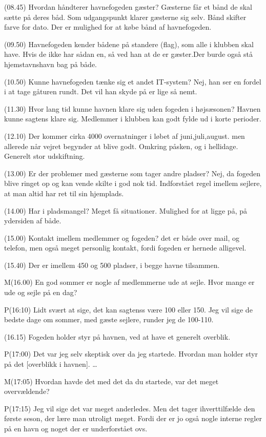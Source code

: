 \documentclass{article}
\begin{document}
(08.45) Hvordan håndterer havnefogeden gæster? Gæsterne får et bånd de skal sætte på deres båd. Som udgangspunkt klarer gæsterne sig selv. Bånd skifter farve for dato. Der er mulighed for at købe bånd af havnefogeden.

(09.50) Havnefogeden kender bådene på standere (flag), som alle i klubben skal have. Hvis de ikke har sådan en, så ved han at de er gæster.Der burde også stå hjemstavnshavn bag på både. 

(10.50) Kunne havnefogeden tænke sig et andet IT-system? Nej, han ser en fordel i at tage gåturen rundt. Det vil han skyde på er lige så nemt. 

(11.30) Hvor lang tid kunne havnen klare sig uden fogeden i højsæsonen? Havnen kunne sagtens klare sig. Medlemmer i klubben kan godt fylde ud i korte perioder.

(12.10) Der kommer cirka 4000 overnatninger i løbet af juni,juli,august. men allerede når vejret begynder at blive godt. Omkring påsken, og i hellidage. Generelt stor udskiftning.

(13.00) Er der problemer med gæsterne som tager andre pladser? Nej, da fogeden blive ringet op og kan vende skilte i god nok tid. Indforstået regel imellem sejlere, at man altid har ret til sin hjemplads.

(14.00) Har i pladsmangel? Meget få situationer. Mulighed for at ligge på, på ydersiden af både.

(15.00) Kontakt imellem medlemmer og fogeden? det er både over mail, og telefon, men også meget personlig kontakt, fordi fogeden er hernede alligevel.

(15.40) Der er imellem 450 og 500 pladser, i begge havne tilsammen.

M(16.00) En god sommer er nogle af medlemmerne ude at sejle. Hvor mange er ude og sejle på en dag?

P(16:10) Lidt svært at sige, det kan sagtenss være 100 eller 150. Jeg vil sige de bedste dage om sommer, med gæste sejlere, runder jeg de 100-110.

(16.15) Fogeden holder styr på havnen, ved at have et generelt overblik.

P(17:00) Det var jeg selv skeptisk over da jeg startede. Hvordan man holder styr på det [overblikk i havnen]. \ldots

M(17:05) Hvordan havde det med det da du startede, var det meget overvældende?

P(17:15) Jeg vil sige det var meget anderledes. Men det tager ihverttilfælde den første seson, der lære man utroligt meget. Fordi der er jo også nogle interne regler på en havn og noget der er underforstået ovs.
\end{document}
